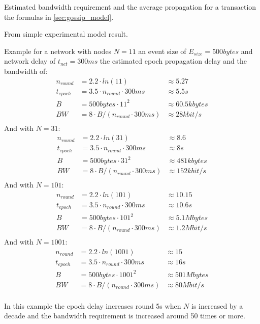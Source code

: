 Estimated bandwidth requirement and the average propagation for a transaction the formulas in \cref{sec:gossip_model}.
 
From simple experimental model result.

Example for a network with nodes $N=11$ an event size of $E_{size}=500bytes$ and network delay of $t_{net}=300ms$ the estimated epoch propagation delay
and the bandwidth of:
\begin{align*}
n_{round} &= 2.2 \cdot ln(11) &\approx  5.27\\
t_{epoch} &= 3.5 \cdot n_{round} \cdot 300ms & \approx 5.5s \\
B &= 500bytes \cdot 11^2 & \approx 60.5kbytes \\
BW &= 8 \cdot B / (n_{round}\cdot 300ms) &\approx 28kbit/s \\
\end{align*}
And with $N=31$:
\begin{align*}
n_{round} &= 2.2 \cdot ln(31) & \approx  8.6\\
t_{epoch} &= 3.5 \cdot n_{round} \cdot 300ms & \approx 8s \\
B &= 500bytes \cdot 31^2 & \approx 481kbytes \\
BW &= 8 \cdot B / (n_{round}\cdot 300ms) &\approx 152kbit/s \\
\end{align*}
And with $N=101$:
\begin{align*}
n_{round} &= 2.2 \cdot ln(101) & \approx  10.15\\
t_{epoch} &= 3.5 \cdot n_{round} \cdot 300ms & \approx 10.6s \\
B &= 500bytes \cdot 101^2 & \approx 5.1Mbytes \\
BW &= 8 \cdot B / (n_{round}\cdot 300ms) & \approx 1.2Mbit/s \\
\end{align*}
And with $N=1001$:
\begin{align*}
n_{round} &= 2.2 \cdot ln(1001) & \approx  15\\
t_{epoch} &= 3.5 \cdot n_{round} \cdot 300ms & \approx 16s \\
B &= 500bytes \cdot 1001^2 & \approx 501Mbytes \\
BW &= 8 \cdot B / (n_{round}\cdot 300ms) &\approx 80Mbit/s \\
\end{align*}

In this example the epoch delay increases round 5s when $N$ is increased by a decade and the bandwidth requirement is increased around 50 times or more.

